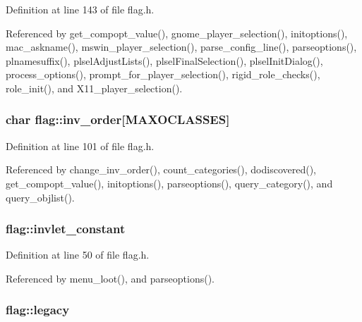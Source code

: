 Definition at line 143 of file flag.\+h.



Referenced by get\+\_\+compopt\+\_\+value(), gnome\+\_\+player\+\_\+selection(), initoptions(), mac\+\_\+askname(), mswin\+\_\+player\+\_\+selection(), parse\+\_\+config\+\_\+line(), parseoptions(), plnamesuffix(), plsel\+Adjust\+Lists(), plsel\+Final\+Selection(), plsel\+Init\+Dialog(), process\+\_\+options(), prompt\+\_\+for\+\_\+player\+\_\+selection(), rigid\+\_\+role\+\_\+checks(), role\+\_\+init(), and X11\+\_\+player\+\_\+selection().

\hypertarget{structflag_afbbdabb7b1593b8ff0036a5c67ece86f}{
\subsubsection[{inv\+\_\+order}]{\setlength{\rightskip}{0pt plus 5cm}char flag\+::inv\+\_\+order\mbox{[}{\bf M\+A\+X\+O\+C\+L\+A\+S\+S\+E\+S}\mbox{]}}}\label{structflag_afbbdabb7b1593b8ff0036a5c67ece86f}


Definition at line 101 of file flag.\+h.



Referenced by change\+\_\+inv\+\_\+order(), count\+\_\+categories(), dodiscovered(), get\+\_\+compopt\+\_\+value(), initoptions(), parseoptions(), query\+\_\+category(), and query\+\_\+objlist().

\hypertarget{structflag_a9e7b11296fcd0fd17d6621651ed24ab6}{
\subsubsection[{invlet\+\_\+constant}]{ flag\+::invlet\+\_\+constant}}\label{structflag_a9e7b11296fcd0fd17d6621651ed24ab6}


Definition at line 50 of file flag.\+h.



Referenced by menu\+\_\+loot(), and parseoptions().

\hypertarget{structflag_a01702b4212b7ef54e2fc9323583bffa2}{
\subsubsection[{legacy}]{ flag\+::legacy}}\label{structflag_a01702b4212b7ef54e2fc9323583bffa2}


